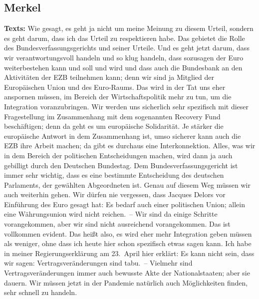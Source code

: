 \documentclass{article}
\begin{document}
\subsection{Merkel}
\noindent\textbf{Texts:} Wie gesagt, es geht ja nicht um meine Meinung zu diesem Urteil, sondern es geht darum, dass ich das Urteil zu respektieren habe. Das gebietet die Rolle des Bundesverfassungsgerichts und seiner Urteile. Und es geht jetzt darum, dass wir verantwortungsvoll handeln und so klug handeln, dass sozusagen der Euro weiterbestehen kann und soll und wird und dass auch die Bundesbank an den Aktivitäten der EZB teilnehmen kann; denn wir sind ja Mitglied der Europäischen Union und des Euro-Raums. Das wird in der Tat uns eher anspornen müssen, im Bereich der Wirtschaftspolitik mehr zu tun, um die Integration voranzubringen. Wir werden uns sicherlich sehr spezifisch mit dieser Fragestellung im Zusammenhang mit dem sogenannten Recovery Fund beschäftigen; denn da geht es um europäische Solidarität. Je stärker die europäische Antwort in dem Zusammenhang ist, umso sicherer kann auch die EZB ihre Arbeit machen; da gibt es durchaus eine Interkonnektion. Alles, was wir in dem Bereich der politischen Entscheidungen machen, wird dann ja auch gebilligt durch den Deutschen Bundestag. Dem Bundesverfassungsgericht ist immer sehr wichtig, dass es eine bestimmte Entscheidung des deutschen Parlaments, der gewählten Abgeordneten ist. Genau auf diesem Weg müssen wir auch weiterhin gehen. Wir dürfen nie vergessen, dass Jacques Delors vor Einführung des Euro gesagt hat: Es bedarf auch einer politischen Union; allein eine Währungsunion wird nicht reichen. – Wir sind da einige Schritte vorangekommen, aber wir sind nicht ausreichend vorangekommen. Das ist vollkommen evident. Das heißt also, es wird eher mehr Integration geben müssen als weniger, ohne dass ich heute hier schon spezifisch etwas sagen kann. Ich habe in meiner Regierungserklärung am 23. April hier erklärt: Es kann nicht sein, dass wir sagen: Vertragsveränderungen sind tabu. – Vielmehr sind Vertragsveränderungen immer auch bewusste Akte der Nationalstaaten; aber sie dauern. Wir müssen jetzt in der Pandemie natürlich auch Möglichkeiten finden, sehr schnell zu handeln.
\end{document}
